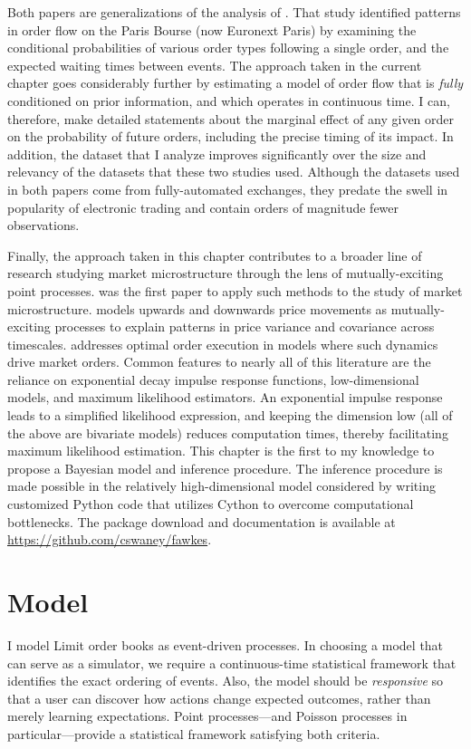 		Both papers are generalizations of the analysis of \cite{Biais1995}. That study identified patterns in order flow on the Paris Bourse (now Euronext Paris) by examining the conditional probabilities of various order types following a single order, and the expected waiting times between events. The approach taken in the current chapter goes considerably further by estimating a model of order flow that is \textit{fully} conditioned on prior information, and which operates in continuous time. I can, therefore, make detailed statements about the marginal effect of any given order on the probability of future orders, including the precise timing of its impact. In addition, the dataset that I analyze improves significantly over the size and relevancy of the datasets that these two studies used. Although the datasets used in both papers come from fully-automated exchanges, they predate the swell in popularity of electronic trading and contain orders of magnitude fewer observations.

		Finally, the approach taken in this chapter contributes to a broader line of research studying market microstructure through the lens of mutually-exciting point processes. \cite{Bowsher2007} was the first paper to apply such methods to the study of market microstructure. \cite{Bacry2013} models upwards and downwards price movements as mutually-exciting processes to explain patterns in price variance and covariance across timescales. \cite{Alfonsi2016} addresses optimal order execution in models where such dynamics drive market orders. Common features to nearly all of this literature are the reliance on exponential decay impulse response functions, low-dimensional models, and maximum likelihood estimators. An exponential impulse response leads to a simplified likelihood expression, and keeping the dimension low (all of the above are bivariate models) reduces computation times, thereby facilitating maximum likelihood estimation. This chapter is the first to my knowledge to propose a Bayesian model and inference procedure. The inference procedure is made possible in the relatively high-dimensional model considered by writing customized Python code that utilizes Cython to overcome computational bottlenecks. The package download and documentation is available at \url{https://github.com/cswaney/fawkes}.


\section{Model}
	I model Limit order books as event-driven processes. In choosing a model that can serve as a simulator, we require a continuous-time statistical framework that identifies the exact ordering of events. Also, the model should be \textit{responsive} so that a user can discover how actions change expected outcomes, rather than merely learning expectations. Point processes---and Poisson processes in particular---provide a statistical framework satisfying both criteria.

